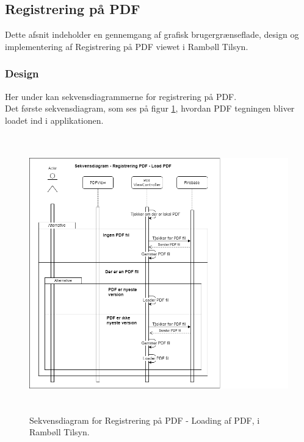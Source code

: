 \subsection{Registrering på PDF}\label{sec:PDF}
Dette afsnit indeholder en gennemgang af grafisk brugergrænseflade, design og implementering af Registrering på PDF viewet i Rambøll Tilsyn.

\subsubsection{Design}
Her under kan sekvensdiagrammerne for registrering på PDF. \\
Det første sekvensdiagram, som ses på figur \ref{fig:LoadPDFSekvensDiagram}, hvordan PDF tegningen bliver loadet ind i applikationen.
\begin{figure}[H] %
	\centering
	\includegraphics[height=12cm, width=15cm]{../ArkitekturDesign/Design/RegisterPDF/LoadPDFSekvensDiagram}
	\caption{Sekvensdiagram for Registrering på PDF - Loading af PDF, i Rambøll Tilsyn.}
	\label{fig:LoadPDFSekvensDiagram}
\end{figure}

\clearpage

